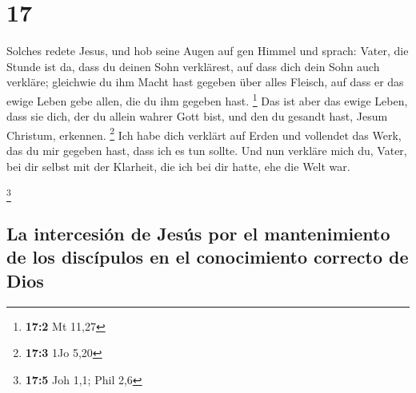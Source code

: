 \hypertarget{section-16}{%
\section{17}\label{section-16}}

 Solches redete Jesus, und hob seine Augen auf gen Himmel
und sprach: Vater, die Stunde ist da, dass du deinen Sohn verklärest,
auf dass dich dein Sohn auch verkläre;  gleichwie du ihm
Macht hast gegeben über alles Fleisch, auf dass er das ewige Leben gebe
allen, die du ihm gegeben hast. \footnote{\textbf{17:2} Mt 11,27}
 Das ist aber das ewige Leben, dass sie dich, der du
allein wahrer Gott bist, und den du gesandt hast, Jesum Christum,
erkennen. \footnote{\textbf{17:3} 1Jo 5,20}  Ich habe dich
verklärt auf Erden und vollendet das Werk, das du mir gegeben hast, dass
ich es tun sollte.  Und nun verkläre mich du, Vater, bei
dir selbst mit der Klarheit, die ich bei dir hatte, ehe die Welt war.

\footnote{\textbf{17:5} Joh 1,1; Phil 2,6}

\hypertarget{la-intercesiuxf3n-de-jesuxfas-por-el-mantenimiento-de-los-discuxedpulos-en-el-conocimiento-correcto-de-dios}{%
\subsection{La intercesión de Jesús por el mantenimiento de los
discípulos en el conocimiento correcto de
Dios}\label{la-intercesiuxf3n-de-jesuxfas-por-el-mantenimiento-de-los-discuxedpulos-en-el-conocimiento-correcto-de-dios}}

